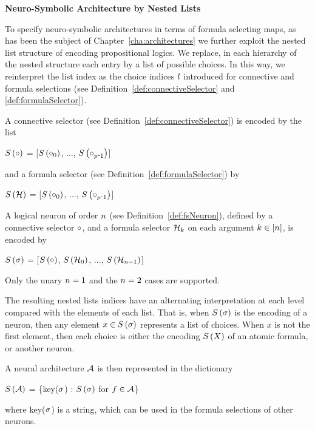 \textbf{Neuro-Symbolic Architecture by Nested Lists}

To specify neuro-symbolic architectures in terms of formula selecting maps, as has been the subject of Chapter~\ref{cha:architectures} we further exploit the nested list structure of encoding propositional logics.
We replace, in each hierarchy of the nested structure each entry by a list of possible choices.
In this way, we reinterpret the list index as the choice indices $l$ introduced for connective and formula selections (see Definition~\ref{def:connectiveSelector} and \ref{def:formulaSelector}).

A connective selector (see Definition~\ref{def:connectiveSelector}) is encoded by the list
	\begin{centeredcode}
			$S\left(\circ\right)$ 
			= [$S\left(\circ_{0}\right)$, $\ldots$, $\synencodingof{\exconnective_{\parlegdim\shortminus1}}$]
	\end{centeredcode}
and a formula selector (see Definition~\ref{def:formulaSelector}) by
	\begin{centeredcode}
			$S\left(\mathcal{H}\right)$ 
			= [$S\left(\circ_{0}\right)$, $\ldots$, $\synencodingof{\exconnective_{\parlegdim\shortminus1}}$]
	\end{centeredcode}
A logical neuron of order $n$ (see Definition~\ref{def:fsNeuron}), defined by a connective selector $\circ$, and a formula selector $\mathcal{H}_k$ on each argument $k\in[n]$, is encoded by
		\begin{centeredcode}
			$S\left(\sigma\right)$ 
			= [$S\left(\circ\right)$, $S\left(\mathcal{H}_0\right)$, $\ldots$,  $S\left(\mathcal{H}_{n-1}\right)$]
		\end{centeredcode}
Only the unary $n=1$ and the $n=2$ cases are supported.


The resulting nested lists indices have an alternating interpretation at each level compared with the elements of each list.
That is, when $S\left(\sigma\right)$ is the encoding of a neuron, then any element $x\in S\left(\sigma\right)$ represents a list of choices.
When $x$ is not the first element, then each choice is either the encoding $S\left(X\right)$ of an atomic formula, or another neuron. 

A neural architecture $\mathcal{A}$ is then represented in the dictionary
\begin{centeredcode}
	$S\left(\mathcal{A}\right)$ = \{key($\sigma$) : $S\left(\sigma\right)$ for $f\in\mathcal{A}$\}
\end{centeredcode}
where key($\sigma$) is a string, which can be used in the formula selections of other neurons.

